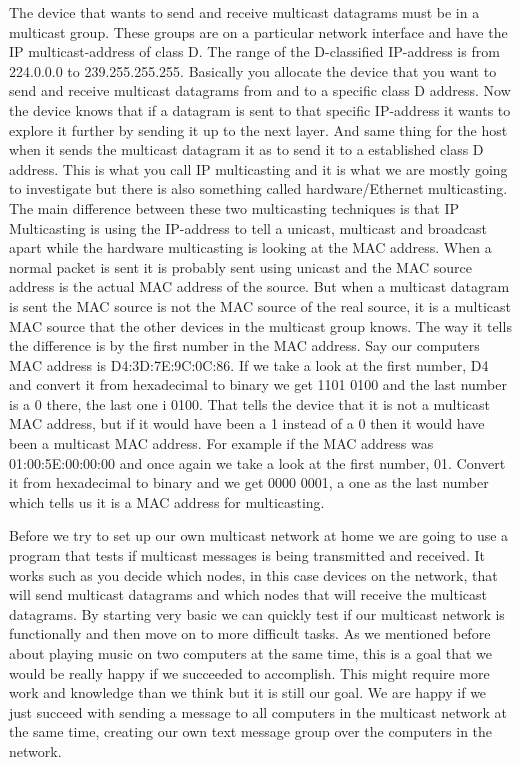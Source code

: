 \documentclass[9pt,a4paper]{acmproc}
\begin{document}
The device that wants to send and receive multicast datagrams must be in a multicast group. These groups are on a particular network interface and have the IP multicast-address of class D. The range of the D-classified IP-address is from 224.0.0.0 to 239.255.255.255. Basically you allocate the device that you want to send and receive multicast datagrams from and to a specific class D address. Now the device knows that if a datagram is sent to that specific IP-address it wants to explore it further by sending it up to the next layer. And same thing for the host when it sends the multicast datagram it as to send it to a established class D address. This is what you call IP multicasting and it is what we are mostly going to investigate but there is also something called hardware/Ethernet multicasting. The main difference between these two multicasting techniques is that IP Multicasting is using the IP-address to tell a unicast, multicast and broadcast apart while the hardware multicasting is looking at the MAC address. When a normal packet is sent it is probably sent using unicast and the MAC source address is the actual MAC address of the source. But when a multicast datagram is sent the MAC source is not the MAC source of the real source, it is a multicast MAC source that the other devices in the multicast group knows. The way it tells the difference is by the first number in the MAC address. Say our computers MAC address is D4:3D:7E:9C:0C:86. If we take a look at the first number, D4 and convert it from hexadecimal to binary we get 1101 0100 and the last number is a 0 there, the last one i 0100. That tells the device that it is not a multicast MAC address, but if it would have been a 1 instead of a 0 then it would have been a multicast MAC address. For example if the MAC address was 01:00:5E:00:00:00 and once again we take a look at the first number, 01. Convert it from hexadecimal to binary and we get 0000 0001, a one as the last number which tells us it is a MAC address for multicasting.

Before we try to set up our own multicast network at home we are going to use a program that tests if multicast messages is being transmitted and received. It works such as you decide which nodes, in this case devices on the network, that will send multicast datagrams and which nodes that will receive the multicast datagrams. By starting very basic we can quickly test if our multicast network is functionally and then move on to more difficult tasks. As we mentioned before about playing music on two computers at the same time, this is a goal that we would be really happy if we succeeded to accomplish. This might require more work and knowledge than we think but it is still our goal. We are happy if we just succeed with sending a message to all computers in the multicast network at the same time, creating our own text message group over the computers in the network.
\end{document}
